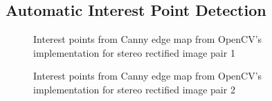 \documentclass{article}
\begin{document}
\subsection{Automatic Interest Point Detection}
\begin{figure}[!htbp]
     \centering
     \captionsetup[subfigure]{labelformat=empty}
    \caption{Interest points from Canny edge map from OpenCV's implementation for stereo rectified image pair 1}
    \label{fig:canny_int_1}
\end{figure}
\begin{figure}[!htbp]
     \centering
     \captionsetup[subfigure]{labelformat=empty}
    \caption{Interest points from Canny edge map from OpenCV's implementation for stereo rectified image pair 2}
    \label{fig:canny_int_2}
\end{figure}
\end{document}

